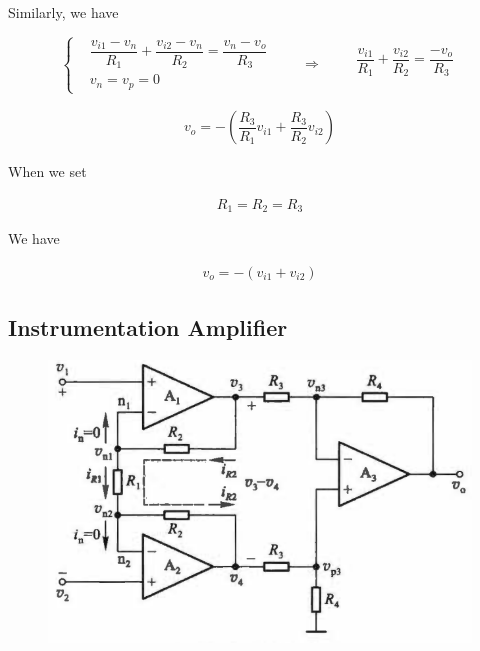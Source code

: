 Similarly, we have

\begin{equation*}
  \left\{
  \begin{aligned}
    & \dfrac{v_{i1} - v_n}{R_1} + \dfrac{v_{i2}- v_n}{R_2} = \dfrac{v_n - v_o}{R_3} \\
    & v_n= v_p = 0
  \end{aligned}
  \right. \quad\quad
  \Rightarrow \quad\quad 
  \begin{aligned}
    \dfrac{v_{i1}}{R_1} + \dfrac{v_{i2}}{R_2} = \dfrac{- v_o}{R_3} \\
  \end{aligned}
\end{equation*}

\begin{equation*}
  \begin{aligned}
    v_o = - \left( \dfrac{R_3}{R_1} v_{i1} + \dfrac{R_3}{R_2} v_{i2} \right) 
  \end{aligned}
\end{equation*}

When we set

\begin{equation*}
  \begin{aligned}
    R_1 = R_2 = R_3
  \end{aligned}
\end{equation*}

We have

\begin{equation*}
  \begin{aligned}
    v_o = - \left( v_{i1} + v_{i2} \right)
  \end{aligned}
\end{equation*}

\subsection{Instrumentation Amplifier}

\begin{figure}[H]
  \centering
  \includegraphics[width=0.8\linewidth]{figures/Instrumentation-Amplifier}
\end{figure}

